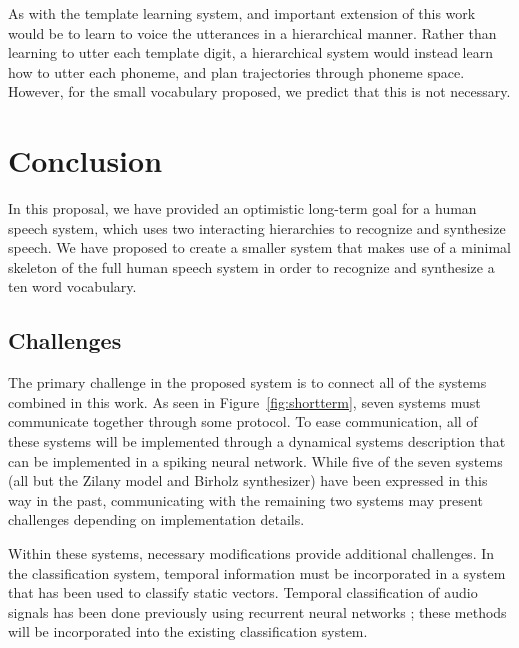 \documentclass{article}
\begin{document}
As with the template learning system,
and important extension of this work
would be to learn to voice
the utterances in a hierarchical manner.
Rather than learning
to utter each template digit,
a hierarchical system would instead
learn how to utter each phoneme,
and plan trajectories through phoneme space.
However, for the small vocabulary proposed,
we predict that this is not necessary.

\section{Conclusion} \label{sec:conclusion}

In this proposal,
we have provided an optimistic long-term goal
for a human speech system,
which uses two interacting hierarchies
to recognize and synthesize speech.
We have proposed to create a smaller system
that makes use of a minimal skeleton
of the full human speech system
in order to recognize and synthesize
a ten word vocabulary.

\subsection{Challenges} \label{subsec:challenges}

The primary challenge in the proposed system
is to connect all of the
systems combined in this work.
As seen in Figure~\ref{fig:shortterm},
seven systems must communicate together
through some protocol.
To ease communication,
all of these systems will be implemented
through a dynamical systems description
that can be implemented
in a spiking neural network.
While five of the seven systems
(all but the Zilany model
and Birholz synthesizer)
have been expressed in this way
in the past,
communicating with the remaining two systems
may present challenges depending on
implementation details.

Within these systems,
necessary modifications provide
additional challenges.
In the classification system,
temporal information
must be incorporated in
a system that has been used
to classify static vectors.
Temporal classification
of audio signals
has been done previously using
recurrent neural networks
\citep{graves2006};
these methods will be
incorporated into the existing
classification system.
\end{document}
